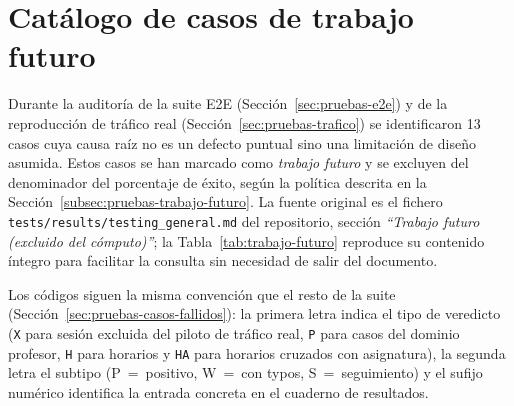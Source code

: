 \section{Catálogo de casos de trabajo futuro}\label{ap:trabajo-futuro}

Durante la auditoría de la suite E2E (Sección~\ref{sec:pruebas-e2e}) y de la reproducción de tráfico real (Sección~\ref{sec:pruebas-trafico}) se identificaron 13 casos cuya causa raíz no es un defecto puntual sino una limitación de diseño asumida. Estos casos se han marcado como \textit{trabajo futuro} y se excluyen del denominador del porcentaje de éxito, según la política descrita en la Sección~\ref{subsec:pruebas-trabajo-futuro}. La fuente original es el fichero \texttt{tests/results/testing\_general.md} del repositorio, sección \textit{``Trabajo futuro (excluido del cómputo)''}; la Tabla~\ref{tab:trabajo-futuro} reproduce su contenido íntegro para facilitar la consulta sin necesidad de salir del documento.

Los códigos siguen la misma convención que el resto de la suite (Sección~\ref{sec:pruebas-casos-fallidos}): la primera letra indica el tipo de veredicto (\texttt{X} para sesión excluida del piloto de tráfico real, \texttt{P} para casos del dominio profesor, \texttt{H} para horarios y \texttt{HA} para horarios cruzados con asignatura), la segunda letra el subtipo (P~=~positivo, W~=~con typos, S~=~seguimiento) y el sufijo numérico identifica la entrada concreta en el cuaderno de resultados.


